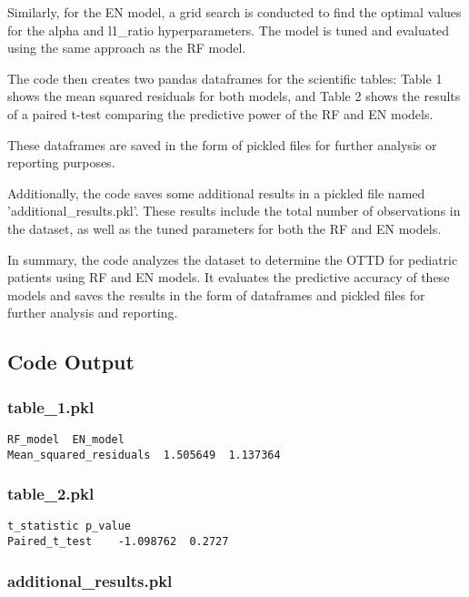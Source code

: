 \documentclass[11pt]{article}
\begin{document}
Similarly, for the EN model, a grid search is conducted to find the optimal values for the alpha and l1\_ratio hyperparameters. The model is tuned and evaluated using the same approach as the RF model.

The code then creates two pandas dataframes for the scientific tables: Table 1 shows the mean squared residuals for both models, and Table 2 shows the results of a paired t-test comparing the predictive power of the RF and EN models.

These dataframes are saved in the form of pickled files for further analysis or reporting purposes.

Additionally, the code saves some additional results in a pickled file named 'additional\_results.pkl'. These results include the total number of observations in the dataset, as well as the tuned parameters for both the RF and EN models.

In summary, the code analyzes the dataset to determine the OTTD for pediatric patients using RF and EN models. It evaluates the predictive accuracy of these models and saves the results in the form of dataframes and pickled files for further analysis and reporting.

\subsection{Code Output}

\subsubsection*{table\_1.pkl}

\begin{Verbatim}[tabsize=4]
                        RF_model  EN_model
Mean_squared_residuals  1.505649  1.137364
\end{Verbatim}

\subsubsection*{table\_2.pkl}

\begin{Verbatim}[tabsize=4]
               t_statistic p_value
Paired_t_test    -1.098762  0.2727
\end{Verbatim}

\subsubsection*{additional\_results.pkl}
\end{document}
